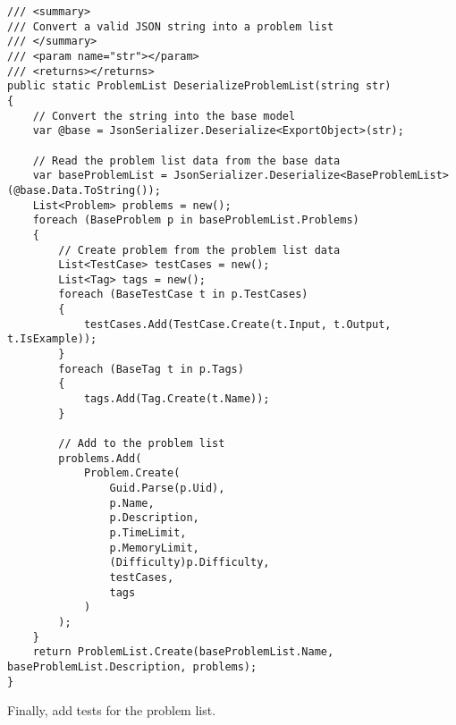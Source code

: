 \documentclass[report.tex]{subfiles}
\begin{document}
\begin{verbatim}
/// <summary>
/// Convert a valid JSON string into a problem list
/// </summary>
/// <param name="str"></param>
/// <returns></returns>
public static ProblemList DeserializeProblemList(string str)
{
    // Convert the string into the base model
    var @base = JsonSerializer.Deserialize<ExportObject>(str);

    // Read the problem list data from the base data
    var baseProblemList = JsonSerializer.Deserialize<BaseProblemList>(@base.Data.ToString());
    List<Problem> problems = new();
    foreach (BaseProblem p in baseProblemList.Problems)
    {
        // Create problem from the problem list data
        List<TestCase> testCases = new();
        List<Tag> tags = new();
        foreach (BaseTestCase t in p.TestCases)
        {
            testCases.Add(TestCase.Create(t.Input, t.Output, t.IsExample));
        }
        foreach (BaseTag t in p.Tags)
        {
            tags.Add(Tag.Create(t.Name));
        }

        // Add to the problem list
        problems.Add(
            Problem.Create(
                Guid.Parse(p.Uid),
                p.Name,
                p.Description,
                p.TimeLimit,
                p.MemoryLimit,
                (Difficulty)p.Difficulty,
                testCases,
                tags
            )
        );
    }
    return ProblemList.Create(baseProblemList.Name, baseProblemList.Description, problems);
}
\end{verbatim}

Finally, add tests for the problem list.
\end{document}
